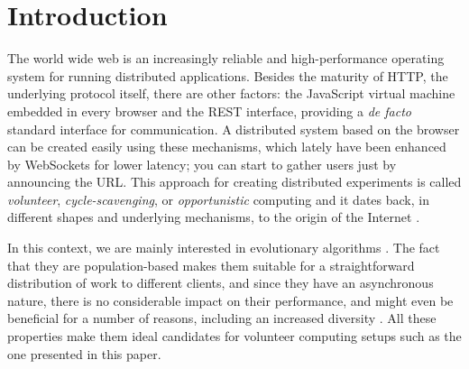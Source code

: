 \documentclass{llncs}
\begin{document}
\section{Introduction}
The world wide web is an increasingly reliable and high-performance
operating system for running distributed applications. Besides the
maturity of HTTP, the underlying protocol itself, there are other
factors: the JavaScript virtual machine embedded in every browser
and the REST interface, providing a {\em de facto} standard interface for
communication. A distributed system based on the browser can be
created easily using these mechanisms, which lately have been enhanced
by WebSockets for lower latency; you can start to gather users just by
announcing the URL. This approach for creating distributed 
experiments is called {\em volunteer}, {\em cycle-scavenging}, 
or {\em opportunistic} computing
\cite{sarmenta2001volunteer} and it dates back, in different shapes
and underlying mechanisms, to the origin of the Internet
\cite{david-seti:home}.

In this context, we are mainly interested in evolutionary algorithms
\cite{milani2004online,sherry2012flex,jj-ppsn98}%
. The fact that they are population-based makes them suitable for a
straightforward distribution of work to different clients, and since
they have an asynchronous nature, there is no considerable impact on
their performance, and might even be beneficial for a number of
reasons, including an increased diversity
\cite{cantu-paz:migration-policies}. All these properties make them
ideal candidates for volunteer computing setups such as the one
presented in this paper.
\end{document}
